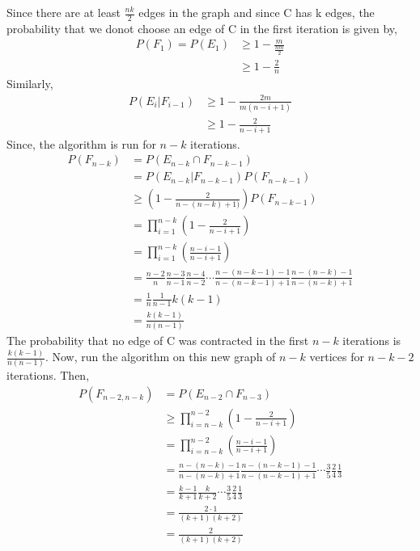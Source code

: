 \documentclass{article}
\begin{document}
\begin{enumerate}
    Since there are at least $\frac{nk}{2}$ edges in the graph and since C has k edges, the probability that we donot choose an edge of C in the first iteration is given by,
    \begin{align*}
        P(F_1)=P(E_1)&\geq 1-\frac{m}{\frac{nm}{2}}\\
        &\geq 1-\frac{2}{n}
    \end{align*}
    Similarly,
    \begin{align*}
        P(E_i | F_{i-1}) &\geq 1-\frac{2m}{m(n-i+1)}\\
        &\geq 1-\frac{2}{n-i+1}
    \end{align*}
    Since, the algorithm is run for $n-k$ iterations.
    \begin{align*}
        P(F_{n-k})&=P(E_{n-k} \cap F_{n-k-1})\\
        &= P(E_{n-k}|F_{n-k-1})P(F_{n-k-1})\\
        &\geq \left ( 1-\frac{2}{n-(n-k)+1)} \right)P(F_{n-k-1})\\
        &= \prod_{i=1}^{n-k} \left( 1-\frac{2}{n-i+1}\right)\\
        &= \prod_{i=1}^{n-k} \left (\frac{n-i-1}{n-i+1} \right)\\
        &= \frac{n-2}{n} \frac{n-3}{n-1} \frac{n-4}{n-2} \cdots \frac{n-(n-k-1)-1}{n-(n-k-1)+1} \frac{n-(n-k)-1}{n-(n-k)+1}\\
        &= \frac{1}{n} \frac{1}{n-1} k(k-1)\\
        &= \frac{k(k-1)}{n(n-1)}
    \end{align*}
    The probability that no edge of C was contracted in the first $n-k$ iterations is $\frac{k(k-1)}{n(n-1)}$. 
    Now, run the algorithm on this new graph of $n-k$ vertices for $n-k-2$ iterations. Then,
    \begin{align*}
        P(F_{n-2,n-k})&=P(E_{n-2} \cap F_{n-3})\\
        &\geq \prod_{i=n-k}^{n-2} \left ( 1-\frac{2}{n-i+1}\right)\\
        &= \prod_{i=n-k}^{n-2} \left ( \frac{n-i-1}{n-i+1}\right)\\
        &= \frac{n-(n-k)-1}{n-(n-k)+1} \frac{n-(n-k-1)-1}{n-(n-k-1)+1} \cdots\frac{3}{5}\frac{2}{4}\frac{1}{3}\\
        &= \frac{k-1}{k+1} \frac{k}{k+2} \cdots\frac{3}{5}\frac{2}{4}\frac{1}{3}\\
        &= \frac{2 \cdot 1}{(k+1)(k+2)}\\
        &= \frac{2}{(k+1)(k+2)}
    \end{align*}

\end{enumerate}
\end{document}
